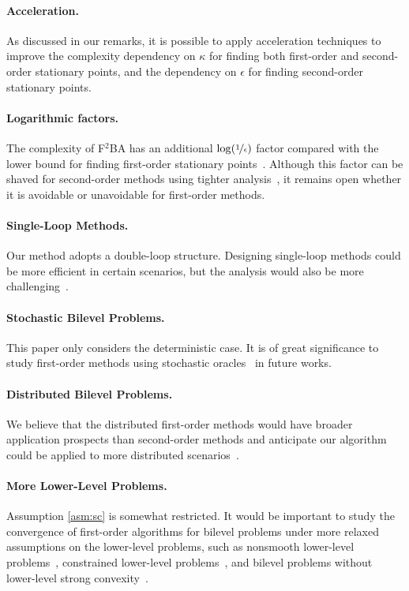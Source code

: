 \documentclass{article}
\begin{document}
\paragraph{Acceleration.} As discussed in our remarks, it is possible to apply acceleration techniques to improve the complexity dependency on $\kappa$ for finding both first-order and second-order stationary points, and the dependency on $\epsilon$ for finding second-order stationary points.
\paragraph{Logarithmic factors.}
The complexity of F${}^2$BA has an additional $\log(\nicefrac{1}{\epsilon})$ factor compared with the lower bound for finding first-order stationary points~\citep{carmon2020lower}. 
Although this factor can be shaved for second-order methods using tighter analysis~\citep{ji2021bilevel},
it remains open whether it is avoidable or unavoidable for first-order methods.
\paragraph{Single-Loop Methods.} 
Our method adopts a double-loop structure. Designing single-loop methods could be more efficient in certain scenarios, but the analysis would also be more challenging~\citep{lin2020gradient,hong2023two,khanduri2021near,chen2022single,kwon2023fully,chen2021closing,chen2023optimal}.
\paragraph{Stochastic Bilevel Problems.} This paper only considers the deterministic case.  It is of great significance to study first-order methods using stochastic oracles~\citep{khanduri2021near,ji2021bilevel,kwon2023fully,huo2023new,yang2021provably} in future works.
\paragraph{Distributed Bilevel Problems.}
We believe that the distributed first-order methods would have broader application prospects than second-order methods and anticipate our algorithm could be applied to more distributed scenarios~\citep{lian2017can,alistarh2018byzantine,bernstein2018signsgd,yuan2022decentralized,wang2022fine,gandikota2021vqsgd,alistarh2018convergence,ye2018communication,scaman2017optimal,mishchenko2022proxskip}.
\paragraph{More Lower-Level Problems.}
Assumption \ref{asm:sc} is somewhat restricted. It would be important to 
study the convergence of first-order algorithms for bilevel problems under more relaxed assumptions on the lower-level problems, such as nonsmooth lower-level problems~\citep{lu2023first}, constrained lower-level problems~\citep{liu2021towards,khanduri2023linearly,tsaknakis2022implicit,xiao2023alternating}, and bilevel problems without lower-level strong convexity~\citep{sow2022constrained,liu2021towards,liu2021value,liu2020generic,chen2023bilevel,shen2023penalty,xiao2023generalized}.




\appendix


% 
% 

% 
\end{document}
